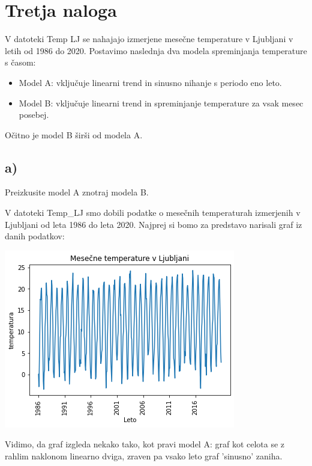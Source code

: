 \documentclass[12pt, a4paper]{article}
\begin{document}
\section*{Tretja naloga}

V datoteki Temp LJ se nahajajo izmerjene mesečne temperature v Ljubljani v 
letih od 1986 do 2020. Postavimo naslednja dva modela spreminjanja temperature
s časom: 

\begin{itemize}
     
    \item Model A: vključuje linearni trend in sinusno nihanje s periodo eno 
        leto.
    \item Model B: vključuje linearni trend in spreminjanje temperature za 
        vsak mesec posebej.

\end{itemize}

Očitno je model B širši od modela A.

\subsection*{a)}

Preizkusite model A znotraj modela B.

V datoteki Temp\_LJ smo dobili podatke o mesečnih temperaturah izmerjenih
v Ljubljani od leta 1986 do leta 2020. Najprej si bomo za predstavo narisali 
graf iz danih podatkov:

\begin{center}
    \includegraphics[scale=0.5]{Naloga_3_01}
\end{center}

Vidimo, da graf izgleda nekako tako, kot pravi model A: graf kot celota se z
rahlim naklonom linearno dviga, zraven pa vsako leto graf 'sinusno' zaniha.
\end{document}
